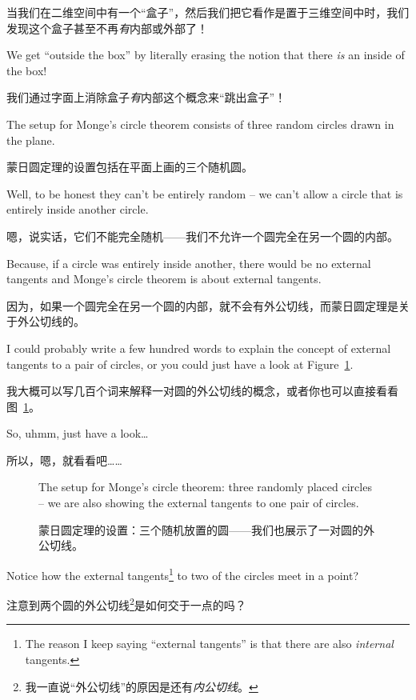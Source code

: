 当我们在二维空间中有一个“盒子”，然后我们把它看作是置于三维空间中时，我们发现这个盒子甚至不再\emph{有}内部或外部了！

We get ``outside 
the box'' by literally erasing the notion that there \emph{is} an inside
of the box!

我们通过字面上消除盒子\emph{有}内部这个概念来“跳出盒子”！

The setup for Monge's circle theorem consists of three random circles
drawn in the plane.

蒙日圆定理的设置包括在平面上画的三个随机圆。

Well, to be honest they can't be entirely random --
we can't allow a circle that is entirely inside another circle.

嗯，说实话，它们不能完全随机——我们不允许一个圆完全在另一个圆的内部。

Because,
if a circle was entirely inside another, there would be no external tangents
and Monge's circle theorem is about external tangents.

因为，如果一个圆完全在另一个圆的内部，就不会有外公切线，而蒙日圆定理是关于外公切线的。

I could probably write a few hundred words to explain the concept of 
external tangents to a pair of circles, or you could just have a look at
Figure~\ref{fig:monge1}.

我大概可以写几百个词来解释一对圆的外公切线的概念，或者你也可以直接看看图~\ref{fig:monge1}。

So, uhmm, just have a look\ldots

所以，嗯，就看看吧……

\begin{figure}[!hbtp] 
\begin{center}

\end{center}
\caption[Setup for Monge's circle theorem.]{The setup for Monge's circle theorem: three randomly placed circles -- we are also showing the external tangents to
one pair of circles.}
\caption[蒙日圆定理的设置。]{蒙日圆定理的设置：三个随机放置的圆——我们也展示了一对圆的外公切线。}
\label{fig:monge1}
\end{figure}
 
Notice how the external tangents\footnote{The reason I keep saying ``external tangents'' is that there are also \emph{internal} tangents.} to two of the circles meet in a point?

注意到两个圆的外公切线\footnote{我一直说“外公切线”的原因是还有\emph{内公切线}。}是如何交于一点的吗？

